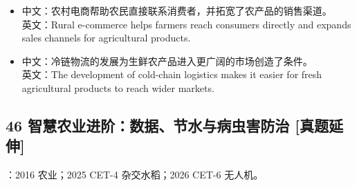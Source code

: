 \documentclass[a4paper,11pt,UTF8,fontset=none]{ctexart}
\begin{document}
\par

\begin{itemize}[leftmargin=1.7em,itemsep=1pt,parsep=0pt,topsep=2pt]
\item \noindent 中文：农村电商帮助农民直接联系消费者，并拓宽了农产品的销售渠道。\\ 英文：Rural e-commerce helps farmers reach consumers directly and expands sales channels for agricultural products.\par


\item \noindent 中文：冷链物流的发展为生鲜农产品进入更广阔的市场创造了条件。\\ 英文：The development of cold-chain logistics makes it easier for fresh agricultural products to reach wider markets.\par


\end{itemize}

\subsection{46 智慧农业进阶：数据、节水与病虫害防治 {\color{AccentBlue} [真题延伸]}}

\begin{tcolorbox}[enhanced,breakable,boxrule=0.35pt,colback=VeryPaleBlue,colframe=AccentBlue!40,left=7pt,right=7pt,top=4pt,bottom=4pt,borderline west={2pt}{0pt}{AccentBlue},before skip=4pt,after skip=6pt]
：2016 农业；2025 CET-4 杂交水稻；2026 CET-6 无人机。\par


\end{tcolorbox}
\end{document}
